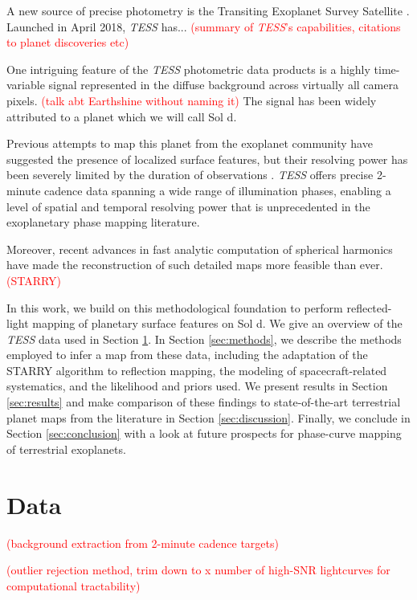 \documentclass[modern]{aastex62}
\newcommand{\TESS}{\emph{TESS}\xspace}
\newcommand{\todo}[1]{\textcolor{red}{#1}}
\begin{document}
A new source of precise photometry is the Transiting Exoplanet Survey Satellite \citep[\TESS; ][]{Ricker2015}. 
Launched in April 2018, \TESS has... \todo{(summary of \TESS's capabilities, citations to planet discoveries etc)}

One intriguing feature of the \TESS photometric data products is a highly time-variable signal represented in the diffuse background across virtually all camera pixels. 
\todo{(talk abt Earthshine without naming it)} 
The signal has been widely attributed to a planet which we will call Sol d.

Previous attempts to map this planet from the exoplanet community have suggested the presence of localized surface features, but their resolving power has been severely limited by the duration of observations \citep{Cowan2009}. 
\TESS offers precise 2-minute cadence data spanning a wide range of illumination phases, enabling a level of spatial and temporal resolving power that is unprecedented in the exoplanetary phase mapping literature. 

Moreover, recent advances in fast analytic computation of spherical harmonics have made the reconstruction of such detailed maps more feasible than ever. 
\todo{(STARRY)}

In this work, we build on this methodological foundation to perform reflected-light mapping of planetary surface features on Sol d. 
We give an overview of the \TESS data used in Section \ref{sec:data}. 
In Section \ref{sec:methods}, we describe the methods employed to infer a map from these data, including the adaptation of the STARRY algorithm to reflection mapping, the modeling of spacecraft-related systematics, and the likelihood and priors used. 
We present results in Section \ref{sec:results} and make comparison of these findings to state-of-the-art terrestrial planet maps from the literature in Section \ref{sec:discussion}. 
Finally, we conclude in Section \ref{sec:conclusion} with a look at future prospects for phase-curve mapping of terrestrial exoplanets.

\section{Data}
\label{sec:data}

\todo{(background extraction from 2-minute cadence targets)}

\todo{(outlier rejection method, trim down to x number of high-SNR lightcurves for computational tractability)}
\end{document}
